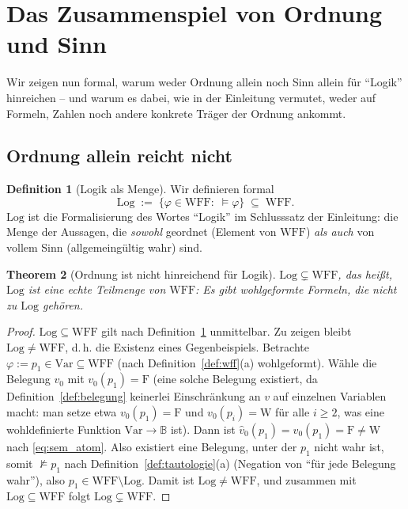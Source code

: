 \documentclass[12pt, a4paper]{article}
\newtheorem{theorem}{Theorem}[section]
\theoremstyle{definition}
\newtheorem{definition}[theorem]{Definition}
\theoremstyle{remark}
\newcommand{\W}{\mathrm{W}}
\newcommand{\F}{\mathrm{F}}
\newcommand{\WFF}{\mathrm{WFF}}
\newcommand{\Var}{\mathrm{Var}}
\newcommand{\Log}{\mathrm{Log}}
\begin{document}
\section{Das Zusammenspiel von Ordnung und Sinn}
\label{sec:zusammenspiel}

Wir zeigen nun formal, warum weder Ordnung allein noch Sinn allein für ``Logik'' hinreichen -- und warum es dabei, wie in der Einleitung vermutet, weder auf Formeln, Zahlen noch andere konkrete Träger der Ordnung ankommt.

\subsection{Ordnung allein reicht nicht}
\label{subsec:ordnung_reicht_nicht}

\begin{definition}[Logik als Menge]
\label{def:logik_menge}
Wir definieren formal
\[
  \Log \;:=\; \{\varphi \in \WFF : \; \models \varphi\} \;\subseteq\; \WFF.
\]
$\Log$ ist die Formalisierung des Wortes ``Logik'' im Schlusssatz der Einleitung: die Menge der Aussagen, die \emph{sowohl} geordnet (Element von $\WFF$) \emph{als auch} von vollem Sinn (allgemeingültig wahr) sind.
\end{definition}

\begin{theorem}[Ordnung ist nicht hinreichend für Logik]
\label{thm:ordnung_nicht_hinreichend}
$\Log \subsetneq \WFF$, das heißt, $\Log$ ist eine \emph{echte} Teilmenge von $\WFF$: Es gibt wohlgeformte Formeln, die nicht zu $\Log$ gehören.
\end{theorem}
\begin{proof}
$\Log \subseteq \WFF$ gilt nach Definition~\ref{def:logik_menge} unmittelbar. Zu zeigen bleibt $\Log \ne \WFF$, d.\,h. die Existenz eines Gegenbeispiels. Betrachte $\varphi := p_1 \in \Var \subseteq \WFF$ (nach Definition~\ref{def:wff}(a) wohlgeformt). Wähle die Belegung $v_0$ mit $v_0(p_1) = \F$ (eine solche Belegung existiert, da Definition~\ref{def:belegung} keinerlei Einschränkung an $v$ auf einzelnen Variablen macht: man setze etwa $v_0(p_1)=\F$ und $v_0(p_i)=\W$ für alle $i\ge 2$, was eine wohldefinierte Funktion $\Var\to\mathbb{B}$ ist). Dann ist $\hat v_0(p_1) = v_0(p_1) = \F \ne \W$ nach \eqref{eq:sem_atom}. Also existiert eine Belegung, unter der $p_1$ nicht wahr ist, somit $\not\models p_1$ nach Definition~\ref{def:tautologie}(a) (Negation von ``für jede Belegung wahr''), also $p_1 \in \WFF \setminus \Log$. Damit ist $\Log \ne \WFF$, und zusammen mit $\Log \subseteq \WFF$ folgt $\Log \subsetneq \WFF$.
\end{proof}
\end{document}
